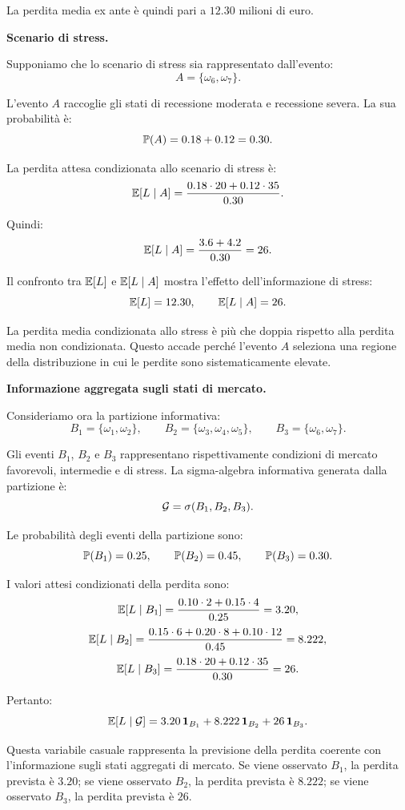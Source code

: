 La perdita media ex ante \`{e} quindi pari a $12.30$ milioni di euro.

\medskip

\noindent
\textbf{Scenario di stress.}

Supponiamo che lo scenario di stress sia rappresentato dall'evento:
\[
A
=
\{\omega_6,\omega_7\}.
\]

L'evento $A$ raccoglie gli stati di recessione moderata e recessione severa.
La sua probabilit\`{a} \`{e}:
\[
\mathbb{P}(A)
=
0.18+0.12
=
0.30.
\]

La perdita attesa condizionata allo scenario di stress \`{e}:
\[
\mathbb{E}[L\mid A]
=
\frac{
0.18\cdot20
+
0.12\cdot35
}
{0.30}.
\]

Quindi:
\[
\mathbb{E}[L\mid A]
=
\frac{3.6+4.2}{0.30}
=
26.
\]

Il confronto tra $\mathbb{E}[L]$ e $\mathbb{E}[L\mid A]$ mostra l'effetto
dell'informazione di stress:
\[
\mathbb{E}[L]=12.30,
\qquad
\mathbb{E}[L\mid A]=26.
\]

La perdita media condizionata allo stress \`{e} pi\`{u} che doppia rispetto
alla perdita media non condizionata. Questo accade perch\'{e} l'evento $A$
seleziona una regione della distribuzione in cui le perdite sono
sistematicamente elevate.

\medskip

\noindent
\textbf{Informazione aggregata sugli stati di mercato.}

Consideriamo ora la partizione informativa:
\[
B_1=\{\omega_1,\omega_2\},
\qquad
B_2=\{\omega_3,\omega_4,\omega_5\},
\qquad
B_3=\{\omega_6,\omega_7\}.
\]

Gli eventi $B_1$, $B_2$ e $B_3$ rappresentano rispettivamente condizioni di
mercato favorevoli, intermedie e di stress. La sigma-algebra informativa
generata dalla partizione \`{e}:
\[
\mathcal{G}
=
\sigma(B_1,B_2,B_3).
\]

Le probabilit\`{a} degli eventi della partizione sono:
\[
\mathbb{P}(B_1)=0.25,
\qquad
\mathbb{P}(B_2)=0.45,
\qquad
\mathbb{P}(B_3)=0.30.
\]

I valori attesi condizionati della perdita sono:
\[
\mathbb{E}[L\mid B_1]
=
\frac{0.10\cdot2+0.15\cdot4}{0.25}
=
3.20,
\]
\[
\mathbb{E}[L\mid B_2]
=
\frac{0.15\cdot6+0.20\cdot8+0.10\cdot12}{0.45}
=
8.222,
\]
\[
\mathbb{E}[L\mid B_3]
=
\frac{0.18\cdot20+0.12\cdot35}{0.30}
=
26.
\]

Pertanto:
\[
\mathbb{E}[L\mid\mathcal{G}]
=
3.20\,\mathbf{1}_{B_1}
+
8.222\,\mathbf{1}_{B_2}
+
26\,\mathbf{1}_{B_3}.
\]

Questa variabile casuale rappresenta la previsione della perdita coerente con
l'informazione sugli stati aggregati di mercato. Se viene osservato $B_1$, la
perdita prevista \`{e} $3.20$; se viene osservato $B_2$, la perdita prevista
\`{e} $8.222$; se viene osservato $B_3$, la perdita prevista \`{e} $26$.

